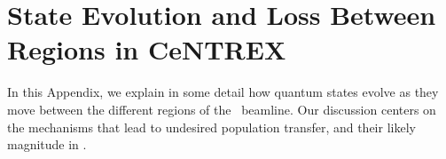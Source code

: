\section{State Evolution and Loss Between Regions in CeNTREX}
\label{sec:non_adiabatic_transitions}

%

In this Appendix, we explain in some detail how quantum states evolve as they move between the different regions of the \CENTREX\ beamline.  Our discussion centers on the mechanisms that lead to undesired population transfer, and their likely magnitude in \CENTREX.

